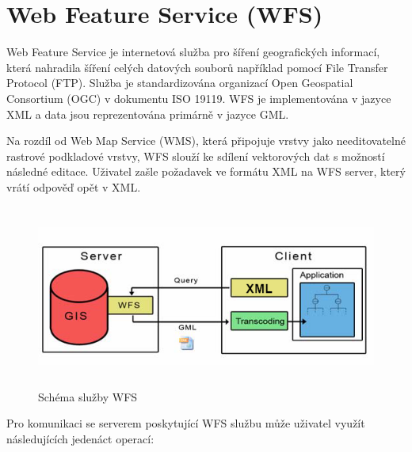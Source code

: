 \documentclass[a4paper,oneside,12pt]{book}
\begin{document}
\section{Web Feature Service (WFS)} \label{wfs}
\hspace{10mm} Web Feature Service je internetová služba pro šíření geografických informací, která nahradila šíření celých datových souborů například pomocí File Transfer Protocol (FTP). Služba je standardizována organizací Open Geospatial Consortium (OGC) v dokumentu  ISO 19119. \cite{Vretanos2014} WFS je implementována v jazyce XML a data jsou reprezentována primárně v jazyce GML. \cite{Zhang2005}

\hspace{10mm} Na rozdíl od Web Map Service (WMS), která připojuje vrstvy jako needitovatelné rastrové podkladové vrstvy, WFS slouží ke sdílení vektorových dat s možností následné editace. Uživatel zašle požadavek ve formátu XML na WFS server, který vrátí odpověď opět v XML. \cite{Zhang2005}

\begin{figure}[ht] \label{obr5}
\centering
\includegraphics[height=6cm]{pictures/XML.png}
\caption{Schéma služby WFS \cite{Schall2009}}
\label{fig:xml}
\end{figure}

\hspace{10mm} Pro komunikaci se serverem poskytující WFS službu může uživatel využít následujících jedenáct operací:
\end{document}
